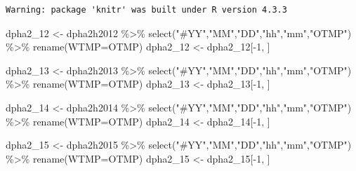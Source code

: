 \documentclass[
  letterpaper,
  DIV=11,
  numbers=noendperiod]{scrreprt}
\newenvironment{Shaded}{\begin{snugshade}}{\end{snugshade}}
\newcommand{\AttributeTok}[1]{\textcolor[rgb]{0.40,0.45,0.13}{#1}}
\newcommand{\DecValTok}[1]{\textcolor[rgb]{0.68,0.00,0.00}{#1}}
\newcommand{\FunctionTok}[1]{\textcolor[rgb]{0.28,0.35,0.67}{#1}}
\newcommand{\NormalTok}[1]{\textcolor[rgb]{0.00,0.23,0.31}{#1}}
\newcommand{\OtherTok}[1]{\textcolor[rgb]{0.00,0.23,0.31}{#1}}
\newcommand{\SpecialCharTok}[1]{\textcolor[rgb]{0.37,0.37,0.37}{#1}}
\newcommand{\StringTok}[1]{\textcolor[rgb]{0.13,0.47,0.30}{#1}}
\begin{document}
\begin{verbatim}
Warning: package 'knitr' was built under R version 4.3.3
\end{verbatim}

\begin{Shaded}
\begin{Highlighting}[]
\NormalTok{dpha2\_12 }\OtherTok{\textless{}{-}}\NormalTok{ dpha2h2012 }\SpecialCharTok{\%\textgreater{}\%} \FunctionTok{select}\NormalTok{(}\StringTok{"\#YY"}\NormalTok{,}\StringTok{"MM"}\NormalTok{,}\StringTok{"DD"}\NormalTok{,}\StringTok{"hh"}\NormalTok{,}\StringTok{"mm"}\NormalTok{,}\StringTok{"OTMP"}\NormalTok{) }\SpecialCharTok{\%\textgreater{}\%}
   \FunctionTok{rename}\NormalTok{(}\AttributeTok{WTMP=}\NormalTok{OTMP)}
\NormalTok{dpha2\_12 }\OtherTok{\textless{}{-}}\NormalTok{ dpha2\_12[}\SpecialCharTok{{-}}\DecValTok{1}\NormalTok{, ]}

\NormalTok{dpha2\_13 }\OtherTok{\textless{}{-}}\NormalTok{ dpha2h2013 }\SpecialCharTok{\%\textgreater{}\%} \FunctionTok{select}\NormalTok{(}\StringTok{"\#YY"}\NormalTok{,}\StringTok{"MM"}\NormalTok{,}\StringTok{"DD"}\NormalTok{,}\StringTok{"hh"}\NormalTok{,}\StringTok{"mm"}\NormalTok{,}\StringTok{"OTMP"}\NormalTok{) }\SpecialCharTok{\%\textgreater{}\%}
   \FunctionTok{rename}\NormalTok{(}\AttributeTok{WTMP=}\NormalTok{OTMP)}
\NormalTok{dpha2\_13 }\OtherTok{\textless{}{-}}\NormalTok{ dpha2\_13[}\SpecialCharTok{{-}}\DecValTok{1}\NormalTok{, ]}

\NormalTok{dpha2\_14 }\OtherTok{\textless{}{-}}\NormalTok{ dpha2h2014 }\SpecialCharTok{\%\textgreater{}\%} \FunctionTok{select}\NormalTok{(}\StringTok{"\#YY"}\NormalTok{,}\StringTok{"MM"}\NormalTok{,}\StringTok{"DD"}\NormalTok{,}\StringTok{"hh"}\NormalTok{,}\StringTok{"mm"}\NormalTok{,}\StringTok{"OTMP"}\NormalTok{) }\SpecialCharTok{\%\textgreater{}\%}
   \FunctionTok{rename}\NormalTok{(}\AttributeTok{WTMP=}\NormalTok{OTMP)}
\NormalTok{dpha2\_14 }\OtherTok{\textless{}{-}}\NormalTok{ dpha2\_14[}\SpecialCharTok{{-}}\DecValTok{1}\NormalTok{, ]}

\NormalTok{dpha2\_15 }\OtherTok{\textless{}{-}}\NormalTok{ dpha2h2015 }\SpecialCharTok{\%\textgreater{}\%} \FunctionTok{select}\NormalTok{(}\StringTok{"\#YY"}\NormalTok{,}\StringTok{"MM"}\NormalTok{,}\StringTok{"DD"}\NormalTok{,}\StringTok{"hh"}\NormalTok{,}\StringTok{"mm"}\NormalTok{,}\StringTok{"OTMP"}\NormalTok{) }\SpecialCharTok{\%\textgreater{}\%}
   \FunctionTok{rename}\NormalTok{(}\AttributeTok{WTMP=}\NormalTok{OTMP)}
\NormalTok{dpha2\_15 }\OtherTok{\textless{}{-}}\NormalTok{ dpha2\_15[}\SpecialCharTok{{-}}\DecValTok{1}\NormalTok{, ]}


\end{Highlighting}
\end{Shaded}
\end{document}
